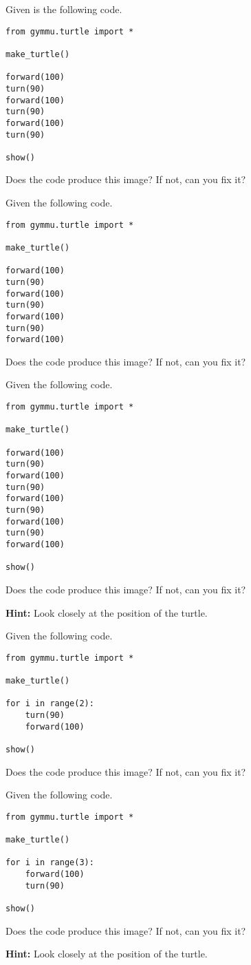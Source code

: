 \documentclass[11pt,a4paper]{report}
\begin{document}
\begin{ex}
Given is the following code.
\begin{lstlisting}
from gymmu.turtle import *

make_turtle()

forward(100)
turn(90)
forward(100)
turn(90)
forward(100)
turn(90)

show()
\end{lstlisting}
Does the code produce this image? If not, can you fix it?
\end{ex}

\begin{ex}
Given  the following code.
\begin{lstlisting}
from gymmu.turtle import *

make_turtle()

forward(100)
turn(90)
forward(100)
turn(90)
forward(100)
turn(90)
forward(100)
\end{lstlisting}
Does the code produce this image? If not, can you fix it?
\end{ex}


\begin{ex}
Given  the following code.
\begin{lstlisting}
from gymmu.turtle import *

make_turtle()

forward(100)
turn(90)
forward(100)
turn(90)
forward(100)
turn(90)
forward(100)
turn(90)
forward(100)

show()
\end{lstlisting}
Does the code produce this image? If not, can you fix it?

\textbf{Hint:} Look closely at the position of the turtle.
\end{ex}


\begin{ex}
Given  the following code.
\begin{lstlisting}
from gymmu.turtle import *

make_turtle()

for i in range(2):
    turn(90)
    forward(100)

show()
\end{lstlisting}
Does the code produce this image? If not, can you fix it?
\end{ex}

\begin{ex}
Given  the following code.
\begin{lstlisting}
from gymmu.turtle import *

make_turtle()

for i in range(3):
    forward(100)
    turn(90)

show()
\end{lstlisting}
Does the code produce this image? If not, can you fix it?

\textbf{Hint:} Look closely at the position of the turtle.
\end{ex}
\end{document}
